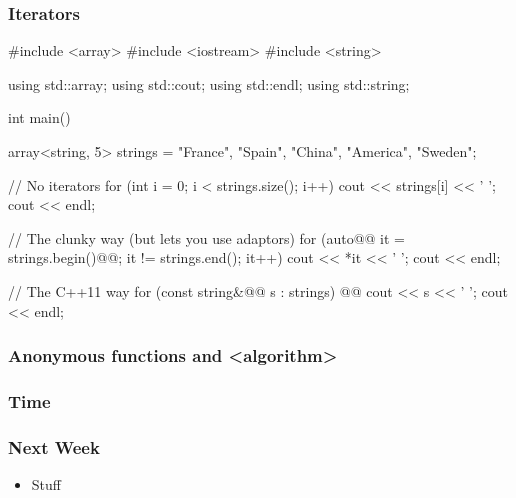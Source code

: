 \documentclass[glossy]{beamer}
\begin{document}
\begin{frame}[fragile=singleslide]
  \frametitle{Iterators}
  \begin{cppcode}
#include <array>
#include <iostream>
#include <string>

using std::array; 
using std::cout; 
using std::endl; 
using std::string; 

int main() { 
  array<string, 5> strings = {"France", "Spain", "China", "America", "Sweden"};

  // No iterators
  for (int i = 0; i < strings.size(); i++) {
    cout << strings[i] << ' ';
  }
  cout << endl;

  // The clunky way (but lets you use adaptors)
  for (auto@@ it = strings.begin()@@; it != strings.end(); it++) {
    cout << *it << ' ';
  }
  cout << endl;

  // The C++11 way
  for (const string&@@ s : strings) {@@
    cout << s << ' ';
  }
  cout << endl;
}
  \end{cppcode}
\end{frame}

\begin{frame}[fragile=singleslide]
  \frametitle{Anonymous functions and <algorithm>}
  \begin{cppcode}
  \end{cppcode}
\end{frame}

\begin{frame}[fragile=singleslide]
  \frametitle{Time}
  \begin{cppcode}
  \end{cppcode}
\end{frame}

\begin{frame}[fragile=singleslide]
  \frametitle{Next Week}
  \begin{itemize}
    \item Stuff
  \end{itemize}
\end{frame}
\end{document}
